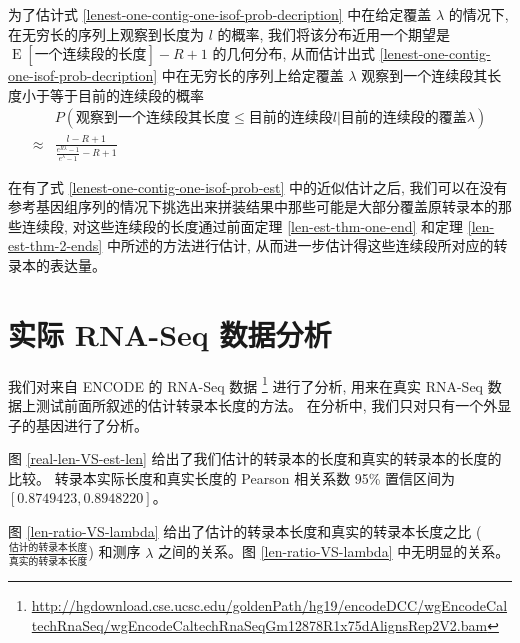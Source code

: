 为了估计式 \eqref{lenest-one-contig-one-isof-prob-decription} 
中在给定覆盖 $\lambda$ 的情况下, 在无穷长的序列上观察到长度为 $l$ 的概率, 
我们将该分布近用一个期望是 $\operatorname{E}[\text{一个连续段的长度}] -R+1$ 的几何分布, 
从而估计出式 \ref{lenest-one-contig-one-isof-prob-decription} 
中在无穷长的序列上给定覆盖 $\lambda$ 观察到一个连续段其长度小于等于目前的连续段的概率
\begin{align}
\label{lenest-one-contig-one-isof-prob-est}
& P(\text{观察到一个连续段其长度} \leq \text{目前的连续段} l |\text{目前的连续段的覆盖} \lambda) \nonumber \\
\approx & \frac{l-R+1}{\frac{e^{R\lambda} -1}{e^{\lambda}-1} -R+1}
\end{align}

在有了式 \eqref{lenest-one-contig-one-isof-prob-est} 中的近似估计之后, 
我们可以在没有参考基因组序列的情况下挑选出来拼装结果中那些可能是大部分覆盖原转录本的那些连续段, 
对这些连续段的长度通过前面定理 \ref{len-est-thm-one-end} 和定理 
\ref{len-est-thm-2-ends} 中所述的方法进行估计, 
从而进一步估计得这些连续段所对应的转录本的表达量。 


\section{实际 RNA-Seq 数据分析}
\label{len-est-real-rna-seq}

我们对来自 ENCODE \cite{encode} 的 RNA-Seq 数据 
\footnote{\url{http://hgdownload.cse.ucsc.edu/goldenPath/hg19/encodeDCC/wgEncodeCaltechRnaSeq/wgEncodeCaltechRnaSeqGm12878R1x75dAlignsRep2V2.bam}} 
进行了分析, 
用来在真实 RNA-Seq 数据上测试前面所叙述的估计转录本长度的方法。 
在分析中, 我们只对只有一个外显子的基因进行了分析。

图 \ref{real-len-VS-est-len} 给出了我们估计的转录本的长度和真实的转录本的长度的比较。
转录本实际长度和真实长度的 Pearson 相关系数 95\% 置信区间为 $[0.8749423, 0.8948220]$。 

图 \ref{len-ratio-VS-lambda} 给出了估计的转录本长度和真实的转录本长度之比 
($\frac{\text{估计的转录本长度}}{\text{真实的转录本长度}}$) 
和测序 $\lambda$ 
之间的关系。图 \ref{len-ratio-VS-lambda} 中无明显的关系。

